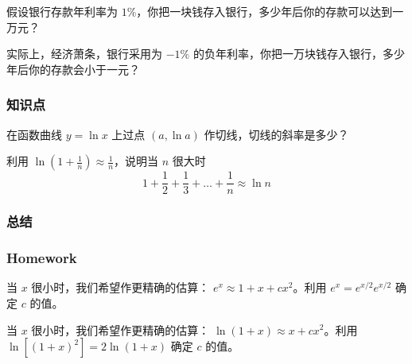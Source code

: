 \documentclass[CJK,13pt]{beamer}
\begin{document}
\begin{frame}

  
  假设银行存款年利率为 $1\%$，你把一块钱存入银行，多少年后你的存款可以达到一万元？
\end{frame}



\begin{frame}

  
  实际上，经济萧条，银行采用为 $-1\%$ 的负年利率，你把一万块钱存入银行，多少年后你的存款会小于一元？
\end{frame}



\begin{frame}
  \frametitle{知识点}
\end{frame}


\begin{frame}
 在函数曲线 $y=\ln x$ 上过点 $(a, \ln a)$ 作切线，切线的斜率是多少？
\end{frame}


\begin{frame}
  利用 $\ln\left(1+\frac{1}{n}\right) \approx \frac{1}{n} $，说明当 $n$ 很大时
  $$1+\frac{1}{2}+\frac{1}{3} + \ldots + \frac{1}{n} \approx \ln n$$
\end{frame}


\begin{frame}
  \frametitle{总结}
\end{frame}



\begin{frame}
  \frametitle{Homework}
  \bitem
\item{当 $x$ 很小时，我们希望作更精确的估算： $e^x \approx 1+x+cx^2$。利用 $e^x=e^{x/2}e^{x/2}$ 确定 $c$ 的值。}
\item{当 $x$ 很小时，我们希望作更精确的估算： $\ln(1+x) \approx x + cx^2 $。利用 $\ln \left[(1+x)^2\right] = 2\ln(1+x)$ 确定 $c$ 的值。}  
  \eitem
\end{frame}

\ech
\end{document}
